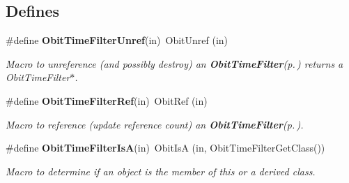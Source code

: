 \subsection*{Defines}
\begin{CompactItemize}
\item 
\#define {\bf Obit\-Time\-Filter\-Unref}(in)\ Obit\-Unref (in)
\begin{CompactList}\small\item\em Macro to unreference (and possibly destroy) an {\bf Obit\-Time\-Filter}{\rm (p.\,\pageref{structObitTimeFilter})} returns a Obit\-Time\-Filter$\ast$. \item\end{CompactList}\item 
\#define {\bf Obit\-Time\-Filter\-Ref}(in)\ Obit\-Ref (in)
\begin{CompactList}\small\item\em Macro to reference (update reference count) an {\bf Obit\-Time\-Filter}{\rm (p.\,\pageref{structObitTimeFilter})}. \item\end{CompactList}\item 
\#define {\bf Obit\-Time\-Filter\-Is\-A}(in)\ Obit\-Is\-A (in, Obit\-Time\-Filter\-Get\-Class())
\begin{CompactList}\small\item\em Macro to determine if an object is the member of this or a derived class. \item\end{CompactList}\end{CompactItemize}
